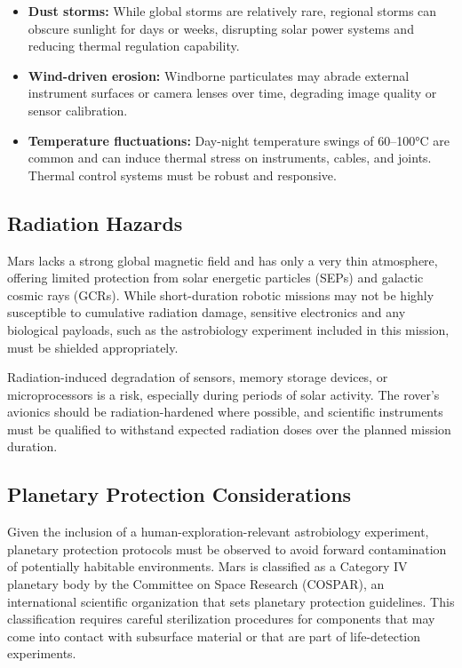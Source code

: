 \begin{itemize}
    \item \textbf{Dust storms:} While global storms are relatively rare, regional storms can obscure sunlight for days or weeks, disrupting solar power systems and reducing thermal regulation capability.
    \item \textbf{Wind-driven erosion:} Windborne particulates may abrade external instrument surfaces or camera lenses over time, degrading image quality or sensor calibration.
    \item \textbf{Temperature fluctuations:} Day-night temperature swings of 60--100°C are common and can induce thermal stress on instruments, cables, and joints. Thermal control systems must be robust and responsive.
\end{itemize}

\subsection*{Radiation Hazards}

Mars lacks a strong global magnetic field and has only a very thin atmosphere, offering limited protection from solar energetic particles (SEPs) and galactic cosmic rays (GCRs). While short-duration robotic missions may not be highly susceptible to cumulative radiation damage, sensitive electronics and any biological payloads, such as the astrobiology experiment included in this mission, must be shielded appropriately.

Radiation-induced degradation of sensors, memory storage devices, or microprocessors is a risk, especially during periods of solar activity. The rover’s avionics should be radiation-hardened where possible, and scientific instruments must be qualified to withstand expected radiation doses over the planned mission duration.

\subsection*{Planetary Protection Considerations}

Given the inclusion of a human-exploration-relevant astrobiology experiment, planetary protection protocols must be observed to avoid forward contamination of potentially habitable environments. Mars is classified as a Category IV planetary body by the Committee on Space Research (COSPAR), an international scientific organization that sets planetary protection guidelines. This classification requires careful sterilization procedures for components that may come into contact with subsurface material or that are part of life-detection experiments.

